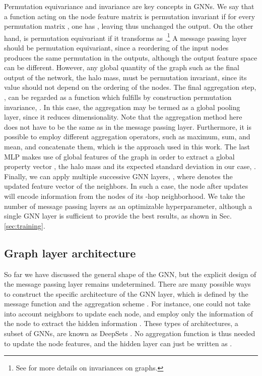 \documentclass[twocolumn]{aastex631}
\begin{document}
Permutation equivariance and invariance are key concepts in GNNs. We say that a function acting on the node feature matrix  is permutation invariant if for every permutation matrix , one has , leaving thus unchanged the output. On the other hand,  is permutation equivariant if it transforms as .\footnote{See \cite{2021arXiv210413478B} for more details on invariances on graphs.} A message passing layer  should be permutation equivariant, since a reordering of the input nodes produces the same permutation in the outputs, although the output feature space can be different. However, any global quantity of the graph such as the final output of the network, the halo mass, must be permutation invariant, since its value should not depend on the ordering of the nodes. The final aggregation step, , can be regarded as a function  which fulfills by construction permutation invariance, . In this case, the aggregation  may be termed as a global pooling layer, since it reduces dimensionality. Note that the aggregation method here does not have to be the same as in the message passing layer. Furthermore, it is possible to employ different aggregation operators, such as maximum, sum, and mean, and concatenate them, which is the approach used in this work. The last MLP  makes use of  global features of the graph in order to extract a global property vector , the halo mass and its expected standard deviation in our case, . Finally, we can apply multiple successive GNN layers, , where  denotes the updated feature vector of the neighbors. In such a case, the node after  updates will encode information from the nodes of its -hop neighborhood. We take the number of message passing layers as an optimizable hyperparameter, although a single GNN layer is sufficient to provide the best results, as shown in Sec. \ref{sec:training}.



\subsection{Graph layer architecture}
\label{sec:architecture}

So far we have discussed the general shape of the GNN, but the explicit design of the message passing layer remains undetermined. There are many possible ways to construct the specific architecture of the GNN layer, which is defined by the message function  and the aggregation scheme . For instance, one could not take into account neighbors to update each node, and employ only the information of the node  to extract the hidden information . These types of architectures, a subset of GNNs, are known as DeepSets \citep{2017arXiv170306114Z}. No aggregation function is thus needed to update the node features, and the hidden layer can just be written as . 
\end{document}
